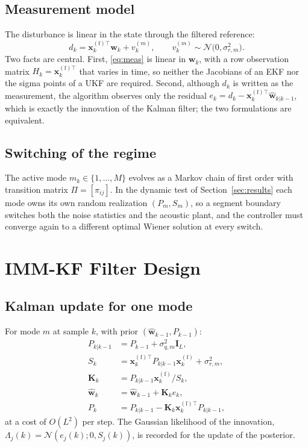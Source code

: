 \documentclass[conference]{IEEEtran}
\begin{document}
\subsection{Measurement model}
The disturbance is linear in the state through the filtered reference:
\begin{equation}
d_k = \mathbf{x}_k^{(\mathrm f)\top} \mathbf{w}_k + v_k^{(m)}, \qquad
v_k^{(m)} \sim \mathcal{N}\!\big(0, \sigma_{r,m}^2\big).
\label{eq:meas}
\end{equation}
Two facts are central. First, \eqref{eq:meas} is linear in $\mathbf{w}_k$, with a
row observation matrix $H_k = \mathbf{x}_k^{(\mathrm f)\top}$ that varies in time, so
neither the Jacobians of an EKF nor the sigma points of a UKF are required. Second,
although $d_k$ is written as the measurement, the algorithm observes only the
residual $e_k = d_k - \mathbf{x}_k^{(\mathrm f)\top}\hat{\mathbf{w}}_{k|k-1}$, which
is exactly the innovation of the Kalman filter; the two formulations are equivalent.

\subsection{Switching of the regime}
The active mode $m_k\in\{1,\dots,M\}$ evolves as a Markov chain of first order with
transition matrix $\Pi=[\pi_{ij}]$. In the dynamic test of
Section~\ref{sec:results} each mode owns its own random realization $(P_m,S_m)$, so
a segment boundary switches both the noise statistics and the acoustic plant, and
the controller must converge again to a different optimal Wiener solution at every
switch.

\section{IMM-KF Filter Design}

\subsection{Kalman update for one mode}
For mode $m$ at sample $k$, with prior $(\hat{\mathbf{w}}_{k-1},P_{k-1})$:
\begin{subequations}
\label{eq:kf}
\begin{align}
P_{k|k-1} &= P_{k-1} + \sigma_{q,m}^2 \mathbf{I}_L, \\
S_k       &= \mathbf{x}_k^{(\mathrm f)\top} P_{k|k-1}\mathbf{x}_k^{(\mathrm f)} + \sigma_{r,m}^2, \\
\mathbf{K}_k &= P_{k|k-1}\mathbf{x}_k^{(\mathrm f)}/S_k, \\
\hat{\mathbf{w}}_k &= \hat{\mathbf{w}}_{k-1} + \mathbf{K}_k e_k, \\
P_k       &= P_{k|k-1} - \mathbf{K}_k \mathbf{x}_k^{(\mathrm f)\top} P_{k|k-1},
\end{align}
\end{subequations}
at a cost of $O(L^2)$ per step. The Gaussian likelihood of the innovation,
$\Lambda_j(k)=\mathcal{N}(e_j(k);0,S_j(k))$, is recorded for the update of the
posterior.
\end{document}
